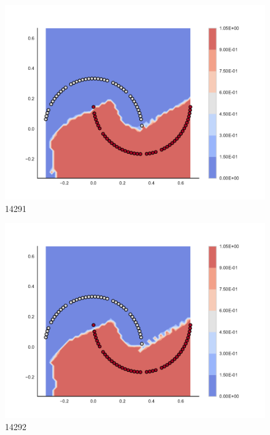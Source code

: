 \begin{subfigure}[b]{0.09\textwidth}
    \includegraphics[clip, trim=2.35cm 1.75cm 4.5cm 0cm,width=\textwidth]{img/convergence/14291.pdf}
    \caption{14291}
    \label{fig:convergence_14291}
\end{subfigure}
%
\begin{subfigure}[b]{0.09\textwidth}
    \includegraphics[clip, trim=2.35cm 1.75cm 4.5cm 0cm,width=\textwidth]{img/convergence/14292.pdf}
    \caption{14292}
    \label{fig:convergence_14292}
\end{subfigure}
%
